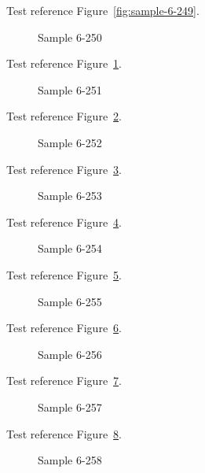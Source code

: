 Test reference Figure~\ref{fig:sample-6-249}.

\begin{figure}[tbhp]
\caption{Sample 6-250}
\label{fig:sample-6-250}
\end{figure}

Test reference Figure~\ref{fig:sample-6-250}.

\begin{figure}[tbhp]
\caption{Sample 6-251}
\label{fig:sample-6-251}
\end{figure}

Test reference Figure~\ref{fig:sample-6-251}.

\begin{figure}[tbhp]
\caption{Sample 6-252}
\label{fig:sample-6-252}
\end{figure}

Test reference Figure~\ref{fig:sample-6-252}.

\begin{figure}[tbhp]
\caption{Sample 6-253}
\label{fig:sample-6-253}
\end{figure}

Test reference Figure~\ref{fig:sample-6-253}.

\begin{figure}[tbhp]
\caption{Sample 6-254}
\label{fig:sample-6-254}
\end{figure}

Test reference Figure~\ref{fig:sample-6-254}.

\begin{figure}[tbhp]
\caption{Sample 6-255}
\label{fig:sample-6-255}
\end{figure}

Test reference Figure~\ref{fig:sample-6-255}.

\begin{figure}[tbhp]
\caption{Sample 6-256}
\label{fig:sample-6-256}
\end{figure}

Test reference Figure~\ref{fig:sample-6-256}.

\begin{figure}[tbhp]
\caption{Sample 6-257}
\label{fig:sample-6-257}
\end{figure}

Test reference Figure~\ref{fig:sample-6-257}.

\begin{figure}[tbhp]
\caption{Sample 6-258}
\label{fig:sample-6-258}
\end{figure}

